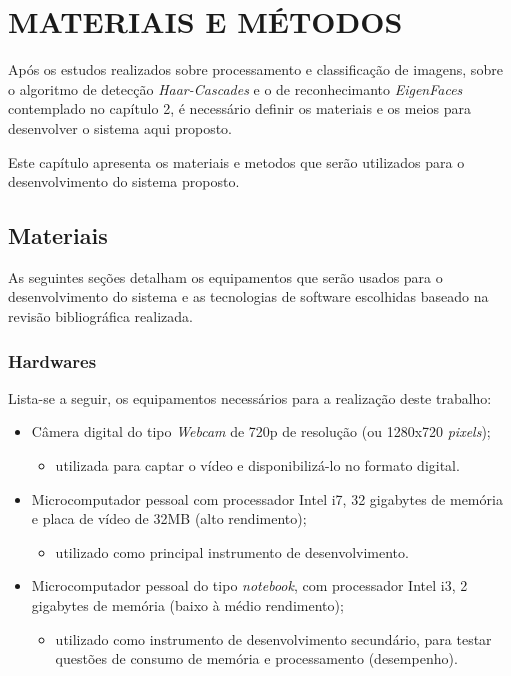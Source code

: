 
\chapter{MATERIAIS E MÉTODOS}\label{ch:materiais-metodos}
Após os estudos realizados sobre processamento e classificação de imagens, sobre o algoritmo de detecção \textit{Haar-Cascades} e o de reconhecimanto \textit{EigenFaces} contemplado no capítulo 2, é necessário definir os materiais e os meios para desenvolver o sistema aqui proposto.

Este capítulo apresenta os materiais e metodos que serão utilizados para o desenvolvimento do sistema proposto.


\section{Materiais}\label{sec: tec-ferramenta}
As seguintes seções detalham os equipamentos que serão usados para o desenvolvimento do sistema e as tecnologias de software escolhidas baseado na revisão bibliográfica realizada.

\subsection{Hardwares}\label{sub-hardw}
Lista-se a seguir, os equipamentos necessários para a realização deste trabalho:

\begin{itemize}
	
	\item Câmera digital do tipo \textit{Webcam} de 720p de resolução (ou 1280x720 \textit{pixels});
	\begin{itemize}
		\item utilizada para captar o vídeo e disponibilizá-lo no formato digital.
	\end{itemize}

	\item Microcomputador pessoal com processador Intel i7, 32 gigabytes de memória e placa de vídeo de 32MB (alto rendimento);
	\begin{itemize}
		\item utilizado como principal instrumento de desenvolvimento.
	\end{itemize}
	
	\item Microcomputador pessoal do tipo \textit{notebook}, com processador Intel i3, 2 gigabytes de memória (baixo à médio rendimento);
	\begin{itemize}
		\item utilizado como instrumento de desenvolvimento secundário, para testar questões de consumo de memória e processamento (desempenho).
	\end{itemize}
	
\end{itemize}



